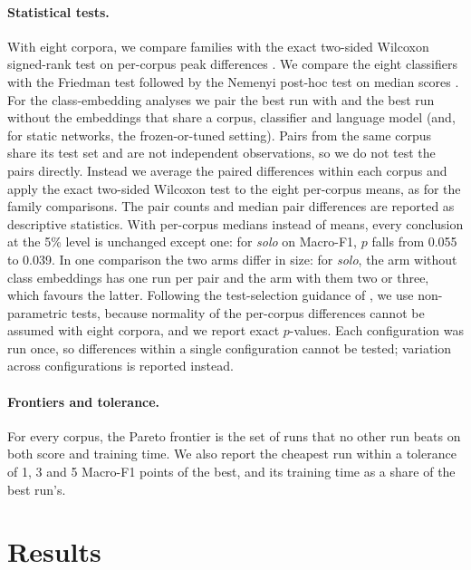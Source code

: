 \documentclass{ijis}
\begin{document}
\paragraph{Statistical tests.} With eight corpora, we compare families with the exact two-sided Wilcoxon signed-rank test on per-corpus peak differences \cite{wilcoxon1945individual,demsar2006statistical}. We compare the eight classifiers with the Friedman test \cite{friedman1937use} followed by the Nemenyi post-hoc test on median scores \cite{demsar2006statistical}. For the class-embedding analyses we pair the best run with and the best run without the embeddings that share a corpus, classifier and language model (and, for static networks, the frozen-or-tuned setting). Pairs from the same corpus share its test set and are not independent observations, so we do not test the pairs directly. Instead we average the paired differences within each corpus and apply the exact two-sided Wilcoxon test to the eight per-corpus means, as for the family comparisons. The pair counts and median pair differences are reported as descriptive statistics. With per-corpus medians instead of means, every conclusion at the 5\% level is unchanged except one: for \emph{solo} on Macro-F1, $p$ falls from 0.055 to 0.039. In one comparison the two arms differ in size: for \emph{solo}, the arm without class embeddings has one run per pair and the arm with them two or three, which favours the latter. Following the test-selection guidance of \cite{dror2018hitchhiker}, we use non-parametric tests, because normality of the per-corpus differences cannot be assumed with eight corpora, and we report exact $p$-values. Each configuration was run once, so differences within a single configuration cannot be tested; variation across configurations is reported instead.

\paragraph{Frontiers and tolerance.} For every corpus, the Pareto frontier is the set of runs that no other run beats on both score and training time. We also report the cheapest run within a tolerance of 1, 3 and 5 Macro-F1 points of the best, and its training time as a share of the best run's.

\section{Results}\label{sec:results}
\end{document}
